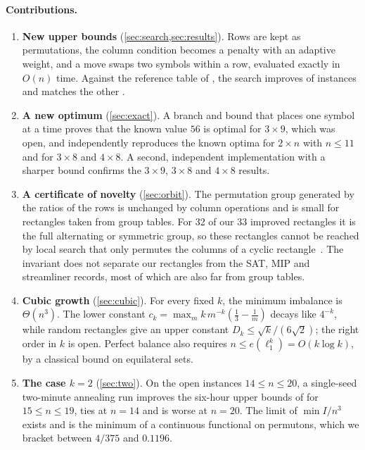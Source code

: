 \documentclass[11pt]{article}
\theoremstyle{plain}
\theoremstyle{definition}
\theoremstyle{remark}
\begin{document}
\paragraph{Contributions.}
\begin{enumerate}[leftmargin=*,itemsep=2pt]
\item \textbf{New upper bounds} (\cref{sec:search,sec:results}). Rows are kept as permutations, the
column condition becomes a penalty with an adaptive weight, and a move swaps two symbols
within a row, evaluated exactly in $O(n)$ time. Against the reference table of
\citet{VoborilRamaswamySzeider2025}, the search improves \NumImproved{} of \NumCells{}
instances and matches the other \NumMatched{}.

\item \textbf{A new optimum} (\cref{sec:exact}). A branch and bound that places one symbol at a
time proves that the known value $56$ is optimal for $3\times 9$, which was open, and independently
reproduces the known optima for $2\times n$ with $n\le 11$ and for $3\times 8$ and $4\times 8$.
A second, independent implementation with a sharper bound confirms the $3\times9$, $3\times8$
and $4\times8$ results.

\item \textbf{A certificate of novelty} (\cref{sec:orbit}). The permutation group generated by
the ratios of the rows is unchanged by column operations and is small for rectangles taken from
group tables. For 32 of our 33 improved rectangles it is the full alternating or symmetric
group, so these rectangles cannot be reached by local search that only permutes the columns of a
cyclic rectangle~\citep{DiazLeBrasGomes2017}. The invariant does not separate our rectangles from
the SAT, MIP and streamliner records, most of which are also far from group tables.

\item \textbf{Cubic growth} (\cref{sec:cubic}). For every fixed $k$, the minimum imbalance is
$\Theta(n^3)$. The lower constant $c_k=\max_m k\,m^{-k}(\frac13-\frac1m)$ decays like $4^{-k}$,
while random rectangles give an upper constant $D_k\le\sqrt k/(6\sqrt2)$; the right order in $k$
is open. Perfect balance also requires $n\le e(\ell_1^k)=O(k\log k)$, by a classical bound on
equilateral sets.

\item \textbf{The case $k=2$} (\cref{sec:two}). On the open instances $14\le n\le 20$, a
single-seed two-minute annealing run improves the six-hour upper bounds of \citet{MirkaEtAl2023} for
$15\le n\le19$, ties at $n=14$ and is worse at $n=20$. The limit of $\min I/n^3$ exists and is the
minimum of a continuous functional on permutons, which we bracket between $4/375$ and $0.1196$.
\end{enumerate}
\end{document}

